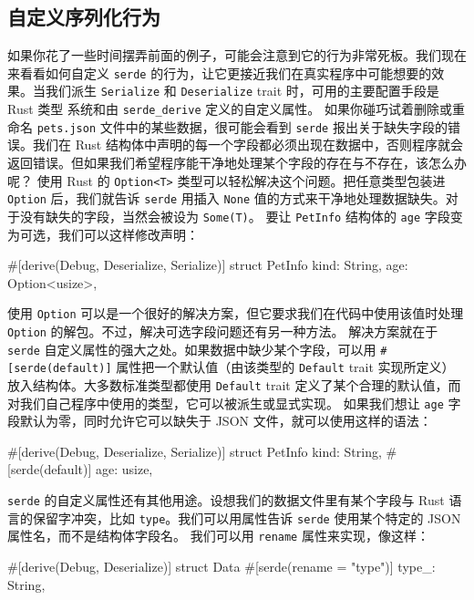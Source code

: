 \subsection{自定义序列化行为}
\label{idx:idx_e39df1b0}
如果你花了一些时间摆弄前面的例子，可能会注意到它的行为非常死板。我们现在来看看如何自定义 \texttt{serde} 的行为，让它更接近我们在真实程序中可能想要的效果。当我们派生 \texttt{Serialize} 和
\texttt{Deserialize} trait 时，可用的主要配置手段是 Rust 类型
系统和由 \texttt{serde\_\allowbreak{}derive} 定义的自定义属性。
如果你碰巧试着删除或重命名 \texttt{pets.json} 文件中的某些数据，很可能会看到 \texttt{serde} 报出关于缺失字段的错误。我们在 Rust 结构体中声明的每一个字段都必须出现在数据中，否则程序就会返回错误。但如果我们希望程序能干净地处理某个字段的存在与不存在，该怎么办呢？
使用 Rust 的 \texttt{Option<T>} 类型可以轻松解决这个问题。把任意类型包装进 \texttt{Option} 后，我们就告诉 \texttt{serde} 用插入 \texttt{None} 值的方式来干净地处理数据缺失。对于没有缺失的字段，当然会被设为 \texttt{Some(T)}。
要让 \texttt{PetInfo} 结构体的 \texttt{age} 字段变为可选，我们可以这样修改声明：
\begin{codebox}[rust]
#[derive(Debug, Deserialize, Serialize)]
struct PetInfo {
    kind: String,
    age: Option<usize>,
}
\end{codebox}
使用 \texttt{Option} 可以是一个很好的解决方案，但它要求我们在代码中使用该值时处理 \texttt{Option} 的解包。不过，解决可选字段问题还有另一种方法。
解决方案就在于 \texttt{serde} 自定义属性的强大之处。如果数据中缺少某个字段，可以用 \texttt{\#[\allowbreak{}serde(\allowbreak{}default)\allowbreak{}]\allowbreak{}} 属性把一个默认值（由该类型的 \texttt{Default} trait 实现所定义）放入结构体。大多数标准类型都使用 \texttt{Default} trait 定义了某个合理的默认值，而对我们自己程序中使用的类型，它可以被派生或显式实现。
如果我们想让 \texttt{age} 字段默认为零，同时允许它可以缺失于 JSON 文件，就可以使用这样的语法：
\begin{codebox}[rust]
#[derive(Debug, Deserialize, Serialize)]
struct PetInfo {
    kind: String,
    #[serde(default)]
    age: usize,
}
\end{codebox}
\label{idx:idx_782e0fb7}
\texttt{serde} 的自定义属性还有其他用途。设想我们的数据文件里有某个字段与 Rust 语言的保留字冲突，比如 \texttt{type}。我们可以用属性告诉 \texttt{serde} 使用某个特定的 JSON 属性名，而不是结构体字段名。
我们可以用 \texttt{rename} 属性来实现，像这样：
\begin{codebox}[rust]
#[derive(Debug, Deserialize)]
struct Data {
    #[serde(rename = "type")]
    type_: String,
}
\end{codebox}
